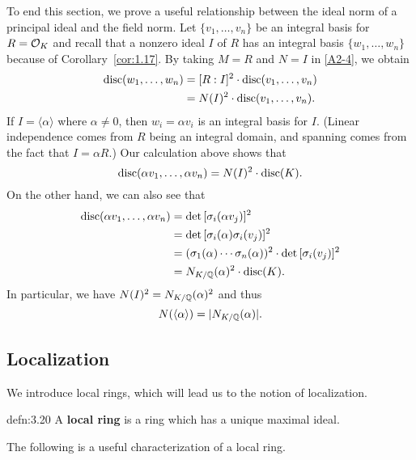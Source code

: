 To end this section, we prove a useful relationship between the ideal norm 
of a principal ideal and the field norm.
Let $\{v_1, \dots, v_n\}$ be an integral basis for $R = {\cal O}_K$ 
and recall that a nonzero ideal $I$ of $R$ has an integral basis 
$\{w_1, \dots, w_n\}$ because of Corollary~\ref{cor:1.17}. By taking 
$M = R$ and $N = I$ in \ref{A2-4}, we obtain 
\begin{align*}
    \operatorname{disc}(w_1, \dots, w_n) &= [R : I]^2 \cdot \operatorname{disc}(v_1, \dots, v_n) \\ 
    &= N(I)^2 \cdot \operatorname{disc}(v_1, \dots, v_n).
\end{align*}
If $I = \langle \alpha \rangle$ where $\alpha \neq 0$, then 
$w_i = \alpha v_i$ is an integral basis for $I$. (Linear independence 
comes from $R$ being an integral domain, and spanning comes from 
the fact that $I = \alpha R$.) Our calculation above shows that 
\[ \operatorname{disc}(\alpha v_1, \dots, \alpha v_n) = N(I)^2 \cdot \operatorname{disc}(K). \] 
On the other hand, we can also see that 
\begin{align*}
    \operatorname{disc}(\alpha v_1, \dots, \alpha v_n) 
    &= \det\,[\sigma_i(\alpha v_j)]^2 \\ 
    &= \det\,[\sigma_i(\alpha) \sigma_i(v_j)]^2 \\ 
    &= (\sigma_1(\alpha) \cdots \sigma_n(\alpha))^2 \cdot \det\,[\sigma_i(v_j)]^2 \\ 
    &= N_{K/\mathbb{Q}}(\alpha)^2 \cdot \operatorname{disc}(K). 
\end{align*}
In particular, we have $N(I)^2 = N_{K/\mathbb{Q}}(\alpha)^2$ and thus 
\[ N(\langle \alpha \rangle) = |N_{K/\mathbb{Q}}(\alpha)|. \] 

\subsection{Localization} \label{subsec:3.5}
We introduce local rings, which will lead us to the notion of localization.

\begin{defn}{defn:3.20}
    A {\bf local ring} is a ring which has a unique maximal ideal.
\end{defn}\vspace{-0.25cm}

The following is a useful characterization of a local ring. 

